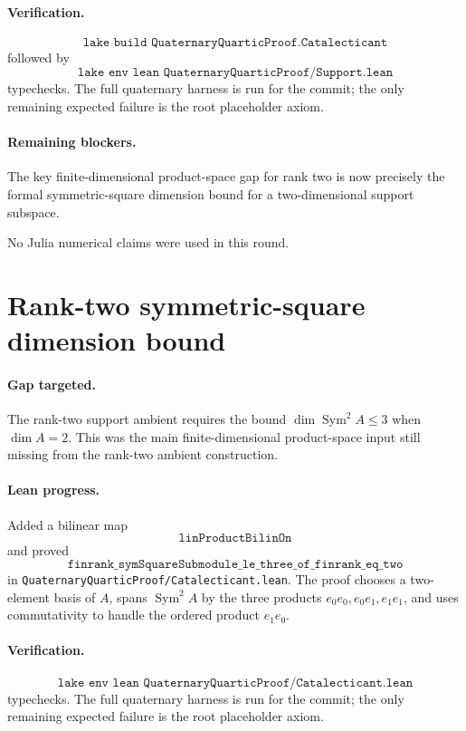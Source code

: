 \documentclass[11pt]{article}
\begin{document}
\paragraph{Verification.}
\[
\texttt{lake build QuaternaryQuarticProof.Catalecticant}
\]
followed by
\[
\texttt{lake env lean QuaternaryQuarticProof/Support.lean}
\]
typechecks.  The full quaternary harness is run for the commit; the only
remaining expected failure is the root placeholder axiom.

\paragraph{Remaining blockers.}
The key finite-dimensional product-space gap for rank two is now precisely the
formal symmetric-square dimension bound for a two-dimensional support subspace.

No Julia numerical claims were used in this round.

\section*{Rank-two symmetric-square dimension bound}

\paragraph{Gap targeted.}
The rank-two support ambient requires the bound
\(\dim\operatorname{Sym}^2 A\le3\) when \(\dim A=2\).  This was the main
finite-dimensional product-space input still missing from the rank-two
ambient construction.

\paragraph{Lean progress.}
Added a bilinear map
\[
\texttt{linProductBilinOn}
\]
and proved
\[
\texttt{finrank\_symSquareSubmodule\_le\_three\_of\_finrank\_eq\_two}
\]
in \texttt{QuaternaryQuarticProof/Catalecticant.lean}.  The proof chooses a
two-element basis of \(A\), spans \(\operatorname{Sym}^2 A\) by the three
products \(e_0e_0,e_0e_1,e_1e_1\), and uses commutativity to handle the
ordered product \(e_1e_0\).

\paragraph{Verification.}
\[
\texttt{lake env lean QuaternaryQuarticProof/Catalecticant.lean}
\]
typechecks.  The full quaternary harness is run for the commit; the only
remaining expected failure is the root placeholder axiom.
\end{document}
